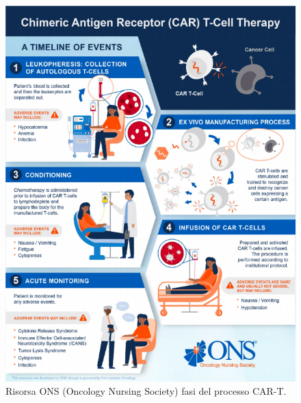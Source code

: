 \begin{figure}[H]
    \begin{center}
    \vspace{-3mm}
    \includegraphics[width=0.9\columnwidth]{img/onsCAR-T.png}
    \end{center}
    \caption{Risorsa ONS (Oncology Nursing Society) fasi del processo CAR-T.
    \cite{ONSCART}}
    \label{fig:FIGURE_5.6}
\end{figure}

